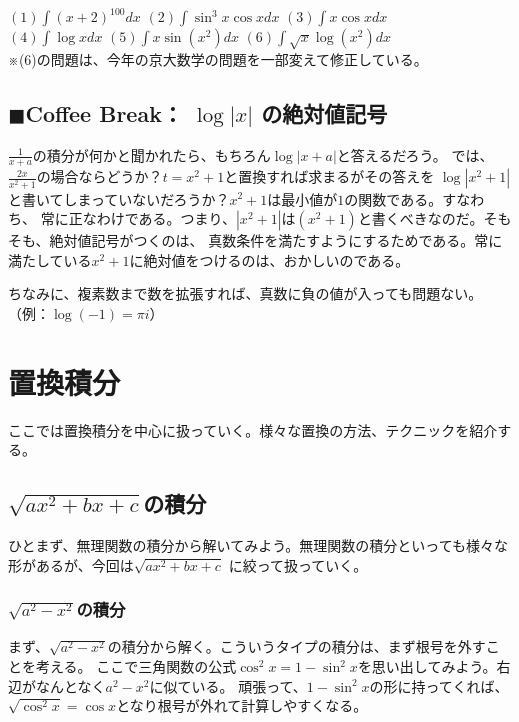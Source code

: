 \documentclass[a4j,dvipdfmx]{jsarticle}
\begin{document}
$(1)\displaystyle\int (x+2)^{100}dx$
\hspace{20mm}
$(2)\displaystyle\int \sin^3 x\cos xdx$
\hspace{20mm}
$(3)\displaystyle\int x\cos xdx$\\

$(4)\displaystyle\int \log xdx$
\hspace{27mm}
$(5)\displaystyle\int x\sin(x^2)dx$
\hspace{24mm}
$(6)\displaystyle\int \sqrt{x}\log(x^2)dx$\\

※(6)の問題は、今年の京大数学の問題を一部変えて修正している。\\
\hrulefill
\subsection{$\blacksquare$Coffee Break： $\log |x|$ の絶対値記号}
\begin{screen}
    $\displaystyle\frac{1}{x+a}$の積分が何かと聞かれたら、もちろん$\log|x+a|$と答えるだろう。
    では、$\displaystyle\frac{2x}{x^2+1}$の場合ならどうか？$t=x^2+1$と置換すれば求まるがその答えを
    $\log|x^2+1|$と書いてしまっていないだろうか？$x^2+1$は最小値が$1$の関数である。すなわち、
    常に正なわけである。つまり、$|x^2+1|$は$(x^2+1)$と書くべきなのだ。そもそも、絶対値記号がつくのは、
    真数条件を満たすようにするためである。常に満たしている$x^2+1$に絶対値をつけるのは、おかしいのである。

    ちなみに、複素数まで数を拡張すれば、真数に負の値が入っても問題ない。（例：$\log(-1)=\pi i$）
\end{screen}
\newpage
\section{置換積分}
ここでは置換積分を中心に扱っていく。様々な置換の方法、テクニックを紹介する。
\subsection{$\sqrt{ax^2+bx+c}$の積分}
ひとまず、無理関数の積分から解いてみよう。無理関数の積分といっても様々な形があるが、今回は$\sqrt{ax^2+bx+c}$
に絞って扱っていく。
\subsubsection{$\sqrt{a^2-x^2}$の積分}
まず、$\sqrt{a^2-x^2}$の積分から解く。こういうタイプの積分は、まず根号を外すことを考える。
ここで三角関数の公式$\cos^2 x=1-\sin^2 x$を思い出してみよう。右辺がなんとなく$a^2-x^2$に似ている。
頑張って、$1-\sin^2 x$の形に持ってくれば、$\sqrt{\cos^2 x}=\cos x$となり根号が外れて計算しやすくなる。
\end{document}

